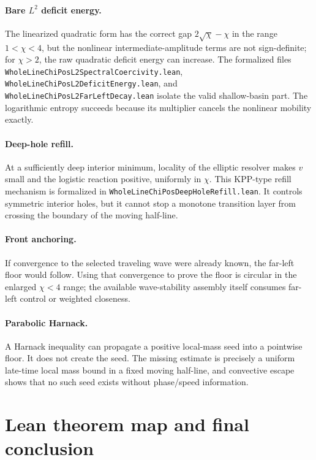 \documentclass[11pt]{article}
\newcommand{\code}[1]{\nolinkurl{#1}}
\begin{document}
\paragraph{Bare \(L^2\) deficit energy.}
The linearized quadratic form has the correct gap
\(2\sqrt\chi-\chi\) in the range \(1<\chi<4\), but the nonlinear
intermediate-amplitude terms are not sign-definite; for \(\chi>2\), the raw
quadratic deficit energy can increase.  The formalized files
\code{WholeLineChiPosL2SpectralCoercivity.lean},
\code{WholeLineChiPosL2DeficitEnergy.lean}, and
\code{WholeLineChiPosL2FarLeftDecay.lean} isolate the valid shallow-basin
part.  The logarithmic entropy succeeds because its multiplier cancels the
nonlinear mobility exactly.

\paragraph{Deep-hole refill.}
At a sufficiently deep interior minimum, locality of the elliptic resolver
makes \(v\) small and the logistic reaction positive, uniformly in \(\chi\).
This KPP-type refill mechanism is formalized in
\code{WholeLineChiPosDeepHoleRefill.lean}.  It controls symmetric interior
holes, but it cannot stop a monotone transition layer from crossing the
boundary of the moving half-line.

\paragraph{Front anchoring.}
If convergence to the selected traveling wave were already known, the
far-left floor would follow.  Using that convergence to prove the floor is
circular in the enlarged \(\chi<4\) range; the available wave-stability
assembly itself consumes far-left control or weighted closeness.

\paragraph{Parabolic Harnack.}
A Harnack inequality can propagate a positive local-mass seed into a pointwise
floor.  It does not create the seed.  The missing estimate is precisely a
uniform late-time local mass bound in a fixed moving half-line, and convective
escape shows that no such seed exists without phase/speed information.

\section{Lean theorem map and final conclusion}
\end{document}
